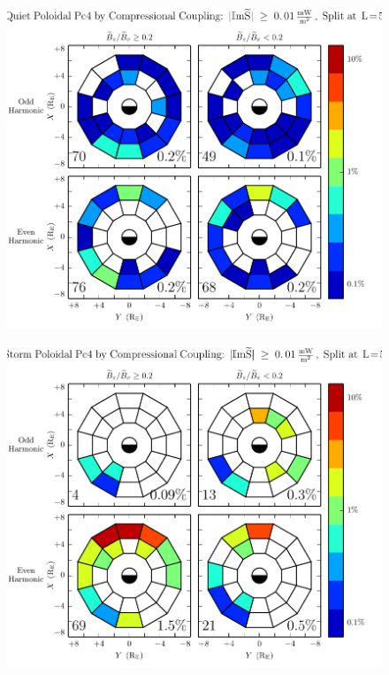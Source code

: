 \begin{figure}[!htb]
    \centering
    \includegraphics[width=\textwidth]{figures/azm_rate_calm.pdf}
    \caption[Poloidal Pc4 Rate by Compressional Coupling: Dst$\geq \SI{-30}{\nT}$]{
      \todo{$\cdots$}
    }
    \label{fig_azm_rate_calm}
\end{figure}


\begin{figure}[!htb]
    \centering
    \includegraphics[width=\textwidth]{figures/azm_rate_storm.pdf}
    \caption[Poloidal Pc4 Rate by Compressional Coupling: Dst$< \SI{-30}{\nT}$]{
      \todo{$\cdots$}
    }
    \label{fig_azm_rate_storm}
\end{figure}



